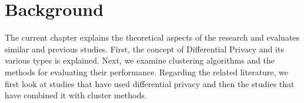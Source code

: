 \chapter{Background}
The current chapter explains the theoretical aspects of the research and evaluates similar and previous studies.
First, the concept of Differential Privacy and its various types is explained.
Next, we examine clustering algorithms and the methods for evaluating their performance.
Regarding the related literature, we first look at studies that have used differential privacy and then the studies that have combined it with cluster methods.



